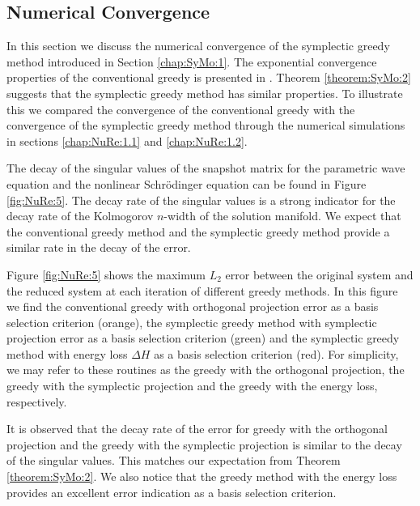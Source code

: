 \subsection{Numerical Convergence} {\edit In this section we discuss the numerical convergence of the symplectic greedy method introduced in Section \ref{chap:SyMo:1}. The exponential convergence properties of the conventional greedy \cite{Quarteroni:2016wi} is presented in \cite{Buffa:2012iz,Binev:2011fj}. Theorem \ref{theorem:SyMo:2} suggests that the symplectic greedy method has similar properties. To illustrate this we compared the convergence of the conventional greedy with the convergence of the symplectic greedy method through the numerical simulations in sections \ref{chap:NuRe:1.1} and \ref{chap:NuRe:1.2}. 

The decay of the singular values of the snapshot matrix for the parametric wave equation and the nonlinear Schr\"odinger equation can be found in Figure \ref{fig:NuRe:5}. The decay rate of the singular values is a strong indicator for the decay rate of the Kolmogorov $n$-width of the solution manifold. We expect that the conventional greedy method and the symplectic greedy method provide a similar rate in the decay of the error.
	
Figure \ref{fig:NuRe:5} shows the maximum $L_2$ error between the original system and the reduced system at each iteration of different greedy methods. In this figure we find the conventional greedy with orthogonal projection error as a basis selection criterion (orange), the symplectic greedy method with symplectic projection error as a basis selection criterion (green) and the symplectic greedy method with energy loss $\Delta H$ as a basis selection criterion (red). For simplicity, we may refer to these routines as the greedy with the orthogonal projection, the greedy with the symplectic projection and the greedy with the energy loss, respectively.

It is observed that the decay rate of the error for greedy with the orthogonal projection and the greedy with the symplectic projection is similar to the decay of the singular values. This matches our expectation from Theorem \ref{theorem:SyMo:2}. We also notice that the greedy method with the energy loss provides an excellent error indication as a basis selection criterion.
}


